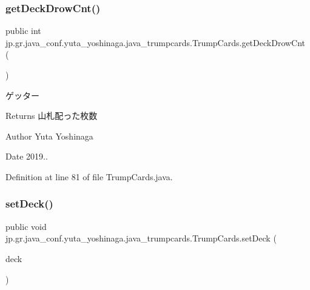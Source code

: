 \subsubsection{\texorpdfstring{get\+Deck\+Drow\+Cnt()}{getDeckDrowCnt()}}
{\footnotesize\ttfamily public int jp.\+gr.\+java\+\_\+conf.\+yuta\+\_\+yoshinaga.\+java\+\_\+trumpcards.\+Trump\+Cards.\+get\+Deck\+Drow\+Cnt (\begin{DoxyParamCaption}{ }\end{DoxyParamCaption})}



ゲッター 

\begin{DoxyReturn}{Returns}
山札配った枚数 
\end{DoxyReturn}
\begin{DoxyAuthor}{Author}
Yuta Yoshinaga 
\end{DoxyAuthor}
\begin{DoxyDate}{Date}
2019.. 
\end{DoxyDate}


Definition at line 81 of file Trump\+Cards.\+java.

\mbox{\label{classjp_1_1gr_1_1java__conf_1_1yuta__yoshinaga_1_1java__trumpcards_1_1_trump_cards_a03b3d1fbcd1d4aaf2ae750ba7c68b9c7}} 
\subsubsection{\texorpdfstring{set\+Deck()}{setDeck()}}
{\footnotesize\ttfamily public void jp.\+gr.\+java\+\_\+conf.\+yuta\+\_\+yoshinaga.\+java\+\_\+trumpcards.\+Trump\+Cards.\+set\+Deck (\begin{DoxyParamCaption}\item[{Array\+List$<$ \hyperlink{classjp_1_1gr_1_1java__conf_1_1yuta__yoshinaga_1_1java__trumpcards_1_1_card}{Card} $>$}]{deck }\end{DoxyParamCaption})}



